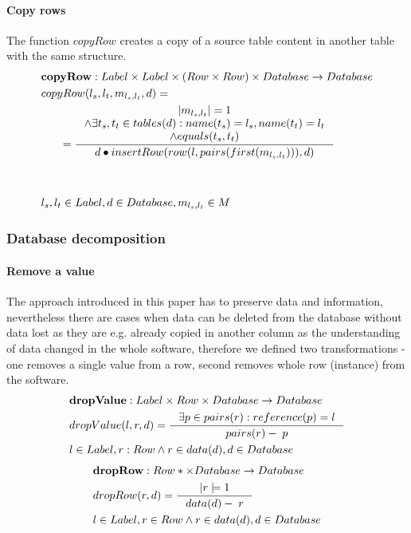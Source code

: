 \documentclass[11pt]{article}
\begin{document}
\paragraph{Copy rows} The function $copyRow$ creates a copy of a source table content in another table with the same structure. 
\begin{align*}
&	\mathbf{copyRow} : Label \times Label \times (Row \times Row) \times Database \rightarrow Database \\
&	copyRow(l_s, l_t, m_{l_s, l_t}, d) = \\
& \;\;\;\;\;\; =%
 	\inference{|m_{l_s, l_t}| = 1 \\ \wedge \exists t_s, t_t \in tables(d) : name(t_s) = l_s, name(t_t) = l_t \\ \wedge equals(t_s, t_t) }{d \bullet insertRow(row(l, pairs(first(m_{l_s, l_t}))), d)} \\\\
\\
&  l_s, l_t \in Label, d \in Database, m_{l_s, l_t} \in M
\end{align*}

\subsubsection{Database decomposition}
\paragraph{Remove a value}  The approach introduced in this paper has to  preserve data and information, nevertheless there are cases when data can be deleted from the database without data lost as they are e.g. already copied in another column as the understanding of data changed in the whole software, therefore we defined two transformations - one removes a single value from a row, second removes whole row (instance) from the software.
\begin{align*}
&	\mathbf{dropValue} : Label \times Row \times Database \rightarrow Database \\
&	dropValue(l, r, d) = \inference{\exists p \in pairs(r) : reference(p) = l}{pairs(r) - \; p}\\ 
& l \in Label, r : Row \wedge r \in data(d), d \in Database
\end{align*}
\begin{align*}
&	\mathbf{dropRow} :  Row*  \times Database \rightarrow Database\\
&	dropRow(r, d) = \inference{|r|=1}{data(d) - \; r}	\\ 
& l \in Label, r \in Row \wedge r \in data(d), d \in Database
\end{align*}
\end{document}
